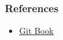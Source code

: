 \begin{frame}

\frametitle{References}

\begin{itemize}
\item \href{https://git-scm.com/book/en/v2}{Git Book}
\end{itemize}
\end{frame}